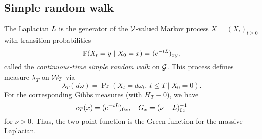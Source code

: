 
\subsection{Simple random walk}



The Laplacian $L$ is the generator of the $\mathcal{V}$-valued Markov process
$X = (X_t)_{t \ge 0}$ with transition probabilities
\begin{equation}
\operatorname{\mathbb{P}}(X_t = y \mid X_0 = x) = (e^{-t L})_{xy},
\end{equation}
called the \emph{continuous-time simple random walk} on $\mathcal{G}$.
This process defines measure $\lambda_T$ on $\mathcal{W}_T$ via
\begin{equation}
\lambda_T(d\omega) = \Pr(X_t = d\omega_t, \, t \le T \mid X_0 = 0).
\end{equation}
For the corresponding Gibbs measures (with $H_T \equiv 0$), we have
\begin{equation}
c_T(x) = (e^{-t L})_{0x},
  \quad
G_x = (\nu + L)^{-1}_{0x}
\end{equation}
for $\nu > 0$. Thus, the two-point function is the Green function for the
massive Laplacian.

